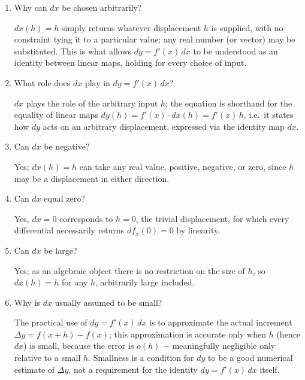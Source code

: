 \documentclass{essay}
\begin{document}
\begin{enumerate}[resume, leftmargin=*, itemsep=8pt]
\item Why can \(dx\) be chosen arbitrarily?
\begin{answer}
\(dx(h)=h\) simply returns whatever displacement \(h\) is supplied, with no constraint tying it to a particular value; any real number (or vector) may be substituted. This is what allows \(dy=f'(x)\,dx\) to be understood as an identity between linear maps, holding for every choice of input.
\end{answer}

\item What role does \(dx\) play in \(dy=f'(x)\,dx\)?
\begin{answer}
\(dx\) plays the role of the arbitrary input \(h\); the equation is shorthand for the equality of linear maps \(dy(h)=f'(x)\cdot dx(h)=f'(x)\,h\), i.e.\ it states how \(dy\) acts on an arbitrary displacement, expressed via the identity map \(dx\).
\end{answer}

\item Can \(dx\) be negative?
\begin{answer}
Yes; \(dx(h)=h\) can take any real value, positive, negative, or zero, since \(h\) may be a displacement in either direction.
\end{answer}

\item Can \(dx\) equal zero?
\begin{answer}
Yes, \(dx=0\) corresponds to \(h=0\), the trivial displacement, for which every differential necessarily returns \(df_x(0)=0\) by linearity.
\end{answer}

\item Can \(dx\) be large?
\begin{answer}
Yes; as an algebraic object there is no restriction on the size of \(h\), so \(dx(h)=h\) for any \(h\), arbitrarily large included.
\end{answer}

\item Why is \(dx\) usually assumed to be small?
\begin{answer}
The practical use of \(dy=f'(x)\,dx\) is to approximate the actual increment \(\Delta y=f(x+h)-f(x)\); this approximation is accurate only when \(h\) (hence \(dx\)) is small, because the error is \(o(h)\) \(-\) meaningfully negligible only relative to a small \(h\). Smallness is a condition for \(dy\) to be a good numerical estimate of \(\Delta y\), not a requirement for the identity \(dy=f'(x)\,dx\) itself.
\end{answer}


\end{enumerate}
\end{document}
